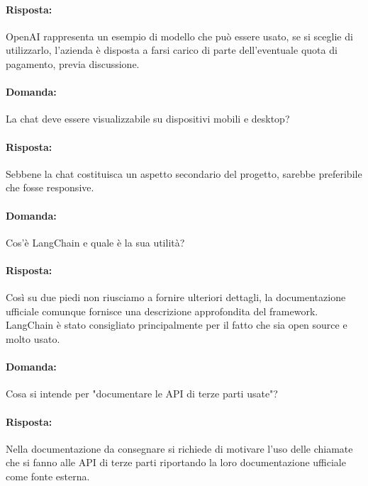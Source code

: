 \documentclass[a4paper, 12pt]{article}
\begin{document}
\paragraph{Risposta:} OpenAI rappresenta un esempio di modello che può essere usato, se si sceglie di utilizzarlo, l'azienda è disposta a farsi carico di parte dell'eventuale quota di pagamento, previa discussione.

\vspace{1.2cm}

\paragraph{Domanda:} La chat deve essere visualizzabile su dispositivi mobili e desktop?
\paragraph{Risposta:} Sebbene la chat costituisca un aspetto secondario del progetto, sarebbe preferibile che fosse responsive.

\vspace{1.2cm}

\paragraph{Domanda:} Cos'è LangChain e quale è la sua utilità?
\paragraph{Risposta:} Così su due piedi non riusciamo a fornire ulteriori dettagli, la documentazione ufficiale comunque fornisce una descrizione approfondita del framework.
LangChain è stato consigliato principalmente per il fatto che sia open source e molto usato. 

\vspace{1.2cm}

\paragraph{Domanda:} Cosa si intende per "documentare le API di terze parti usate"?
\paragraph{Risposta:} Nella documentazione da consegnare si richiede di motivare l'uso delle chiamate che si fanno alle API di terze parti riportando la loro documentazione ufficiale come fonte esterna.
\end{document}
